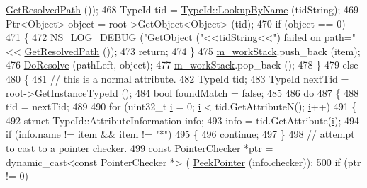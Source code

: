 \begin{DoxyCode}
      \hyperlink{classns3_1_1Resolver_a0788cf21229e40fba6219ec44b9148bb}{GetResolvedPath} ());
468       TypeId tid = \hyperlink{classns3_1_1TypeId_a119cf99c20931fdc294602cd360b180e}{TypeId::LookupByName} (tidString);
469       Ptr<Object> \textcolor{keywordtype}{object} = root->GetObject<Object> (tid);
470       \textcolor{keywordflow}{if} (\textcolor{keywordtype}{object} == 0)
471         \{
472           \hyperlink{group__logging_ga413f1886406d49f59a6a0a89b77b4d0a}{NS\_LOG\_DEBUG} (\textcolor{stringliteral}{"GetObject ("}<<tidString<<\textcolor{stringliteral}{") failed on path="}<<
      \hyperlink{classns3_1_1Resolver_a0788cf21229e40fba6219ec44b9148bb}{GetResolvedPath} ());
473           \textcolor{keywordflow}{return};
474         \}
475       \hyperlink{classns3_1_1Resolver_a7b3477fa2e0e29524a56740f1d13fe96}{m\_workStack}.push\_back (item);
476       \hyperlink{classns3_1_1Resolver_ae91ec5c188ee8da874e4915193efb000}{DoResolve} (pathLeft, \textcolor{keywordtype}{object});
477       \hyperlink{classns3_1_1Resolver_a7b3477fa2e0e29524a56740f1d13fe96}{m\_workStack}.pop\_back ();
478     \}
479   \textcolor{keywordflow}{else} 
480     \{
481       \textcolor{comment}{// this is a normal attribute.}
482       TypeId tid;
483       TypeId nextTid = root->GetInstanceTypeId ();
484       \textcolor{keywordtype}{bool} foundMatch = \textcolor{keyword}{false};
485       
486       \textcolor{keywordflow}{do}
487         \{
488           tid = nextTid;
489           
490           \textcolor{keywordflow}{for} (uint32\_t \hyperlink{bernuolliDistribution_8m_a6f6ccfcf58b31cb6412107d9d5281426}{i} = 0; \hyperlink{bernuolliDistribution_8m_a6f6ccfcf58b31cb6412107d9d5281426}{i} < tid.GetAttributeN(); \hyperlink{bernuolliDistribution_8m_a6f6ccfcf58b31cb6412107d9d5281426}{i}++)
491             \{
492               \textcolor{keyword}{struct }TypeId::AttributeInformation info;
493               info = tid.GetAttribute(\hyperlink{bernuolliDistribution_8m_a6f6ccfcf58b31cb6412107d9d5281426}{i});
494               \textcolor{keywordflow}{if} (info.name != item && item != \textcolor{stringliteral}{"*"})
495                 \{
496                   \textcolor{keywordflow}{continue};
497                 \}
498               \textcolor{comment}{// attempt to cast to a pointer checker.}
499               \textcolor{keyword}{const} PointerChecker *ptr = \textcolor{keyword}{dynamic\_cast<}\textcolor{keyword}{const }PointerChecker *\textcolor{keyword}{>} (
      \hyperlink{namespacens3_af2a7557fe9afdd98d8f6f8f6e412cf5a}{PeekPointer} (info.checker));
500               \textcolor{keywordflow}{if} (ptr != 0)

\end{DoxyCode}
